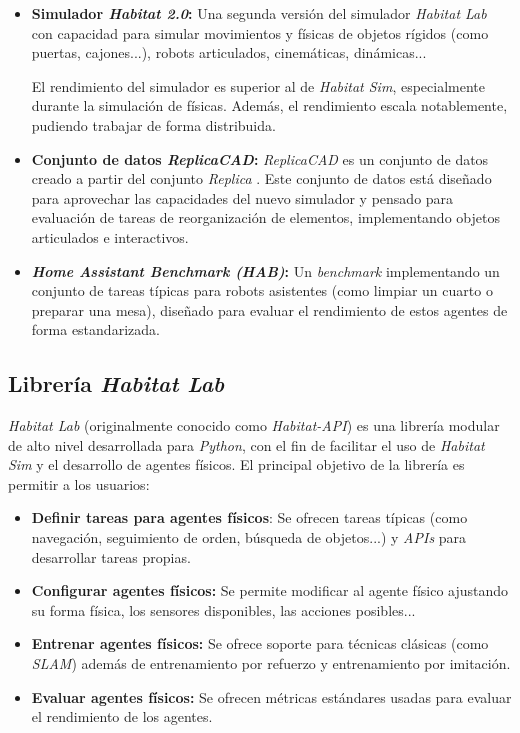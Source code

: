 \begin{itemize}
	\item \textbf{Simulador \textit{Habitat 2.0}:} Una segunda versión del simulador \textit{Habitat Lab} con capacidad para simular movimientos y físicas de objetos rígidos (como puertas, cajones...), robots articulados, cinemáticas, dinámicas...
	
El rendimiento del simulador es superior al de \textit{Habitat Sim}, especialmente durante la simulación de físicas. Además, el rendimiento escala notablemente, pudiendo trabajar de forma distribuida. 
	
	\item \textbf{Conjunto de datos \textit{ReplicaCAD}:} \textit{ReplicaCAD} es un conjunto de datos creado a partir del conjunto \textit{Replica} \cite{DBLP:journals/corr/abs-1906-05797}. Este conjunto de datos está diseñado para aprovechar las capacidades del nuevo simulador y pensado para evaluación de tareas de reorganización de elementos, implementando objetos articulados e interactivos.
	
	\item \textbf{\textit{Home Assistant Benchmark (HAB)}:} Un \textit{benchmark} implementando un conjunto de tareas típicas para robots asistentes (como limpiar un cuarto o preparar una mesa), diseñado para evaluar el rendimiento de estos agentes de forma estandarizada.
\end{itemize}

\subsection{Librería \textit{Habitat Lab}}

\textit{Habitat Lab} (originalmente conocido como \textit{Habitat-API}) \cite{habitat19iccv} es una librería modular de alto nivel desarrollada para \textit{Python}, con el fin de facilitar el uso de \textit{Habitat Sim} y el desarrollo de agentes físicos. El principal objetivo de la librería es permitir a los usuarios:

\begin{itemize}
	\item \textbf{Definir tareas para agentes físicos}: Se ofrecen tareas típicas (como navegación, seguimiento de orden, búsqueda de objetos...) y \textit{APIs} para desarrollar tareas propias.
	\item \textbf{Configurar agentes físicos:} Se permite modificar al agente físico ajustando su forma  física, los sensores disponibles, las acciones posibles...
	\item \textbf{Entrenar agentes físicos:} Se ofrece soporte para técnicas clásicas (como \textit{SLAM}) además de entrenamiento por refuerzo y entrenamiento por imitación.
	\item \textbf{Evaluar agentes físicos:} Se ofrecen métricas estándares \cite{DBLP:journals/corr/abs-1807-06757} usadas para evaluar el rendimiento de los agentes.
\end{itemize}

